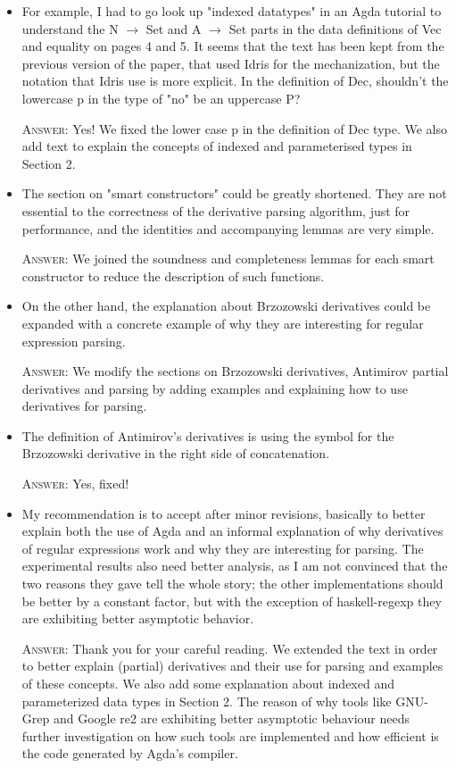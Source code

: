 \documentclass{article}
\begin{document}
\begin{itemize}
    
    \item For example, I had to go look up "indexed datatypes" in an Agda tutorial
    to understand the N $\to$ Set and A $\to$ Set parts in the data definitions of Vec
    and equality on pages 4 and 5. It seems that the text has been kept from
    the previous version of the paper, that used Idris for the mechanization,
    but the notation that Idris use is more explicit. In the definition of Dec,
    shouldn't the lowercase p in the type of "no" be an uppercase P?

    \textsc{Answer}: Yes! We fixed the lower case p in the definition of Dec type.
    We also add text to explain the concepts of indexed and parameterised types in
    Section 2.

    \item The section on "smart constructors" could be greatly shortened. They are
    not essential to the correctness of the derivative parsing algorithm,
    just for performance, and the identities and accompanying lemmas are
    very simple.

    \textsc{Answer}: We joined the soundness and completeness lemmas for each smart constructor to
    reduce the description of such functions.

    \item On the other hand, the explanation about Brzozowski derivatives could
    be expanded with a concrete example of why they are interesting for
    regular expression parsing.

    \textsc{Answer}: We modify the sections on Brzozowski derivatives, Antimirov partial derivatives 
    and parsing by adding examples and explaining how to use derivatives for parsing.

    \item The definition of Antimirov's derivatives is using the symbol for
    the Brzozowski derivative in the right side of concatenation.

    \textsc{Answer}: Yes, fixed!

    \item My recommendation is to accept after minor revisions, basically to
    better explain both the use of Agda and an informal explanation of why
    derivatives of regular expressions work and why they are interesting
    for parsing. The experimental results also need better analysis, as
    I am not convinced that the two reasons they gave tell the whole story;
    the other implementations should be better by a constant factor, but
    with the exception of haskell-regexp they are exhibiting better asymptotic
    behavior.

    \textsc{Answer}: Thank you for your careful reading. We extended the text in order
    to better explain (partial) derivatives and their use
    for parsing and examples of these concepts. We also add some explanation about
    indexed and parameterized data types in Section 2. The reason of why tools like 
    GNU-Grep and Google re2 are exhibiting better asymptotic behaviour needs further 
    investigation on how such tools are implemented and how efficient is the code 
    generated by Agda's compiler. 
\end{itemize}    
\end{document}
